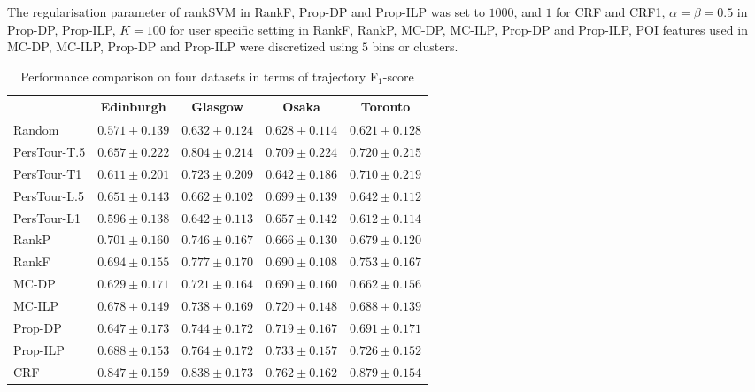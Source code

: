 The regularisation parameter of rankSVM in RankF, Prop-DP and Prop-ILP was set to $1000$, and $1$ for CRF and CRF1,
$\alpha=\beta=0.5$ in Prop-DP, Prop-ILP, 
$K=100$ for user specific setting in RankF, RankP, MC-DP, MC-ILP, Prop-DP and Prop-ILP,
POI features used in MC-DP, MC-ILP, Prop-DP and Prop-ILP were discretized using $5$ bins or clusters.




\begin{table*}
\centering
\caption{Performance comparison on four datasets in terms of trajectory F$_1$-score}
\begin{tabular}{l|cccc} \hline
 & Edinburgh & Glasgow & Osaka & Toronto \\ \hline
Random & $0.571\pm0.139$ & $0.632\pm0.124$ & $0.628\pm0.114$ & $0.621\pm0.128$ \\
PersTour-T.5 & $0.657\pm0.222$ & $0.804\pm0.214$ & $0.709\pm0.224$ & $0.720\pm0.215$ \\
PersTour-T1 & $0.611\pm0.201$ & $0.723\pm0.209$ & $0.642\pm0.186$ & $0.710\pm0.219$ \\
PersTour-L.5 & $0.651\pm0.143$ & $0.662\pm0.102$ & $0.699\pm0.139$ & $0.642\pm0.112$ \\
PersTour-L1 & $0.596\pm0.138$ & $0.642\pm0.113$ & $0.657\pm0.142$ & $0.612\pm0.114$ \\
RankP & $0.701\pm0.160$ & $0.746\pm0.167$ & $0.666\pm0.130$ & $0.679\pm0.120$ \\
RankF & $0.694\pm0.155$ & $0.777\pm0.170$ & $0.690\pm0.108$ & $0.753\pm0.167$ \\
MC-DP & $0.629\pm0.171$ & $0.721\pm0.164$ & $0.690\pm0.160$ & $0.662\pm0.156$ \\
MC-ILP & $0.678\pm0.149$ & $0.738\pm0.169$ & $0.720\pm0.148$ & $0.688\pm0.139$ \\
Prop-DP & $0.647\pm0.173$ & $0.744\pm0.172$ & $0.719\pm0.167$ & $0.691\pm0.171$ \\
Prop-ILP & $0.688\pm0.153$ & $0.764\pm0.172$ & $0.733\pm0.157$ & $0.726\pm0.152$ \\
CRF & $\mathbf{0.847\pm0.159}$ & $\mathbf{0.838\pm0.173}$ & $\mathbf{0.762\pm0.162}$ & $\mathbf{0.879\pm0.154}$ \\
\hline
\end{tabular}
\end{table*}


